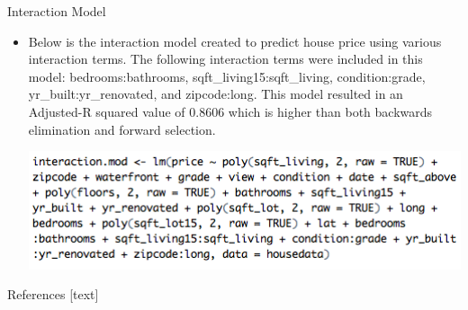 \documentclass[final]{beamer}\usepackage[]{graphicx}\usepackage[]{color}
\begin{document}
\begin{frame}[fragile]
\begin{columns}[t]
\begin{column}{0.31\linewidth}
\begin{minipage}[t][.955\textheight]{\linewidth}
\vspace{0ex}
\begin{block}{Interaction Model}
\begin{itemize}
\item Below  is the interaction model created to predict house price using various interaction terms. The following interaction terms were included in this model: bedrooms:bathrooms, sqft\_living15:sqft\_living, condition:grade, yr\_built:yr\_renovated, and zipcode:long. This model resulted in an Adjusted-R squared value of 0.8606 which is higher than both backwards elimination and forward selection. 
\vspace{1ex}
\begin{center}\includegraphics[width=12in]{picture3.png}\end{center}
\end{itemize}
\vspace{0ex}
\end{block}
\vfill

\begin{block}{References}
\footnotesize
{}[text]
\vspace{-1ex}



\normalsize
\vfill
\end{block} 
\vfill

\end{minipage}
\end{column}%




\end{columns}
\end{frame}
\end{document}
